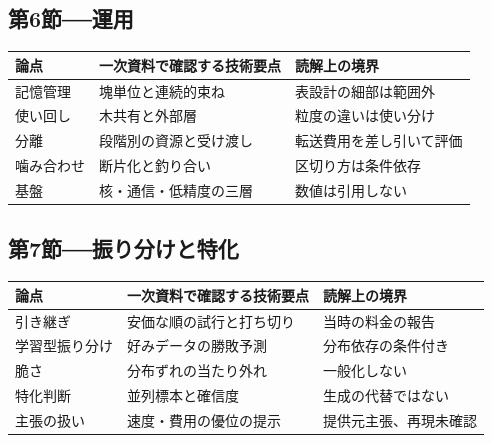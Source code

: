 \documentclass[lualatex,a4paper,10pt]{jlreq}
\begin{document}
\subsection*{第6節──運用}
\begin{tabularx}{\textwidth}{@{}>{\raggedright\arraybackslash}p{}>{\raggedright\arraybackslash}p{}>{\raggedright\arraybackslash}X@{}}
\toprule
論点 & 一次資料で確認する技術要点 & 読解上の境界 \\
\midrule
記憶管理 & 塊単位と連続的束ね & 表設計の細部は範囲外 \\
使い回し & 木共有と外部層 & 粒度の違いは使い分け \\
分離 & 段階別の資源と受け渡し & 転送費用を差し引いて評価 \\
噛み合わせ & 断片化と釣り合い & 区切り方は条件依存 \\
基盤 & 核・通信・低精度の三層 & 数値は引用しない \\
\bottomrule
\end{tabularx}
\autocite{pagedattn,sglang,splitwise,mooncake,sarathi}
\normalsize

\subsection*{第7節──振り分けと特化}
\begin{tabularx}{\textwidth}{@{}>{\raggedright\arraybackslash}p{}>{\raggedright\arraybackslash}p{}>{\raggedright\arraybackslash}X@{}}
\toprule
論点 & 一次資料で確認する技術要点 & 読解上の境界 \\
\midrule
引き継ぎ & 安価な順の試行と打ち切り & 当時の料金の報告 \\
学習型振り分け & 好みデータの勝敗予測 & 分布依存の条件付き \\
脆さ & 分布ずれの当たり外れ & 一般化しない \\
特化判断 & 並列標本と確信度 & 生成の代替ではない \\
主張の扱い & 速度・費用の優位の提示 & 提供元主張、再現未確認 \\
\bottomrule
\end{tabularx}
\autocite{frugalgpt,routellm,fragility,sysone,jevmodels}
\normalsize
\end{document}
